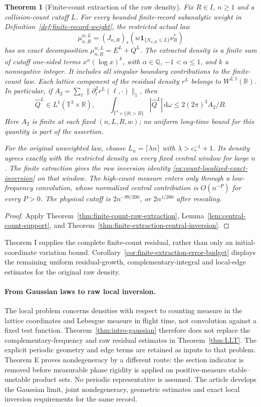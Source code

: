 \documentclass[11pt,reqno]{amsart}
\numberwithin{equation}{section}
\newtheorem{maintheorem}{Theorem}
\theoremstyle{definition}\newtheorem{definition}[theorem]{Definition}
\theoremstyle{remark}\newtheorem{remark}[theorem]{Remark}
\newcommand{\R}{\mathbb R}\newcommand{\Z}{\mathbb Z}\newcommand{\T}{\mathbb T}
\newcommand{\dd}{\,\mathrm d}\newcommand{\one}{\mathbf1}
\begin{document}
\begin{maintheorem}[Finite-count extraction of the raw density]
\label{thm:intro-finite-count-extraction}
Fix $R\in I$, $n\ge1$ and a collision-count cutoff $L$. For every
bounded finite-record subanalytic weight in
Definition~\ref{def:finite-record-weight}, the restricted actual law
\[
 \mu_{n,R}^{w,L}=(J_{n,R})_*
                    (w\one_{\{N_{n,R}\le L\}}\nu_R^*)
\]
has an exact decomposition $\mu_{n,R}^{w,L}=E^L+Q^L$.
The extracted density is a finite sum of cutoff one-sided terms
$x^\alpha(\log x)^k$, with $\alpha\in\mathbb Q$, $-1<\alpha\le1$,
and $k$ a nonnegative integer. It includes all singular boundary
contributions to the finite-count law. Each lattice component of the
residual density $r^L$ belongs to $W^{2,1}(\R)$. In particular, if
$A_2=\sum_\ell\|\partial_t^2 r^L(\ell,\cdot)\|_1$, then
\[
 \widehat Q^L\in L^1(\T^3\times\R),\qquad
 \int_{\T^3\times\{|b|>B\}}|\widehat Q^L|\dd\omega
                   \le 2(2\pi)^3 A_2/B .
\]
Here $A_2$ is finite at each fixed $(n,L,R,w)$; no uniform long-time
bound for this quantity is part of the assertion.

For the original unweighted law, choose $L_n=\lceil\lambda n\rceil$
with $\lambda>c_*^{-1}+1$. Its density agrees exactly with the restricted
density on every fixed central window for large $n$.
The finite extraction gives the raw inversion identity
\eqref{eq:count-localized-exact-inversion} on that window. The
high-count measure enters only through a low-frequency convolution,
whose normalized central contribution is $O(n^{-P})$ for every $P>0$.
The physical cutoff is $2n^{-99/200}$, or $2n^{1/200}$ after rescaling.
\end{maintheorem}
\begin{proof}
Apply Theorem~\ref{thm:finite-count-raw-extraction},
Lemma~\ref{lem:central-count-support}, and
Theorem~\ref{thm:finite-extraction-central-inversion}.
\end{proof}

Theorem I supplies the complete finite-count residual, rather than only
an initial-coordinate variation bound. Corollary~\ref{cor:finite-extraction-error-budget}
displays the remaining uniform residual-growth, complementary-integral
and local-edge estimates for the original raw density.

\paragraph{From Gaussian laws to raw local inversion.}
The local problem concerns densities with respect to counting measure
in the lattice coordinates and Lebesgue measure in flight time, not
convolution against a fixed test function. Theorem~\ref{thm:intro-gaussian}
therefore does not replace the complementary-frequency and raw residual
estimates in Theorem~\ref{thm:LLT}. The explicit periodic geometry
and edge terms are retained as inputs to that problem. Theorem E proves
nondegeneracy by a different route: the section indicator is removed
before measurable phase rigidity is applied on positive-measure
stable--unstable product sets. No periodic representative is assumed.
The article develops the Gaussian limit, joint nondegeneracy, geometric
estimates and exact local inversion requirements for the same record.
\end{document}
